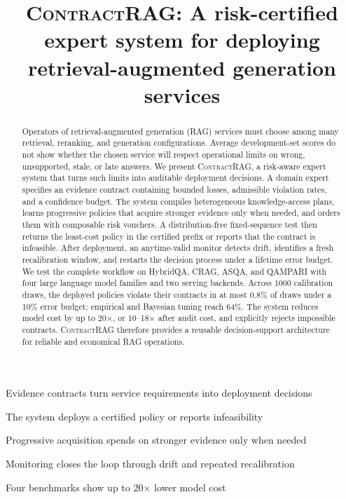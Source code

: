 \documentclass[a4paper,fleqn,doubleblind]{cas-dc}
\newcommand{\system}{\textsc{ContractRAG}\xspace}
\begin{document}
\let\WriteBookmarks\relax
\def\floatpagepagefraction{1}
\def\textpagefraction{.001}


\shortauthors{}

\title[mode = title]{\system: A risk-certified expert system for
deploying retrieval-augmented generation services}

\begin{abstract}
Operators of retrieval-augmented generation (RAG) services must choose
among many retrieval, reranking, and generation configurations. Average
development-set scores do not show whether the chosen service will
respect operational limits on wrong, unsupported, stale, or late
answers. We present \system, a risk-aware expert system that turns such
limits into auditable deployment decisions. A domain expert specifies
an evidence contract containing bounded losses, admissible violation
rates, and a confidence budget. The system compiles heterogeneous
knowledge-access plans, learns progressive policies that acquire
stronger evidence only when needed, and orders them with composable
risk vouchers. A distribution-free fixed-sequence test then returns
the least-cost policy in the certified prefix or reports that the
contract is infeasible. After deployment, an anytime-valid monitor
detects drift, identifies a fresh recalibration window, and restarts the
decision process under a lifetime error budget. We test the complete
workflow on HybridQA, CRAG, ASQA, and QAMPARI with four large language
model families and two serving backends. Across 1000 calibration draws,
the deployed policies violate their contracts in at most 0.8\% of
draws under a 10\% error budget; empirical and Bayesian tuning reach
64\%. The system reduces model cost by up to 20$\times$, or
10--18$\times$ after audit cost, and explicitly rejects impossible
contracts. \system therefore provides a reusable decision-support
architecture for reliable and economical RAG operations.
\end{abstract}

\begin{highlights}
\item Evidence contracts turn service requirements into deployment decisions
\item The system deploys a certified policy or reports infeasibility
\item Progressive acquisition spends on stronger evidence only when needed
\item Monitoring closes the loop through drift and repeated recalibration
\item Four benchmarks show up to 20$\times$ lower model cost
\end{highlights}
\end{document}
